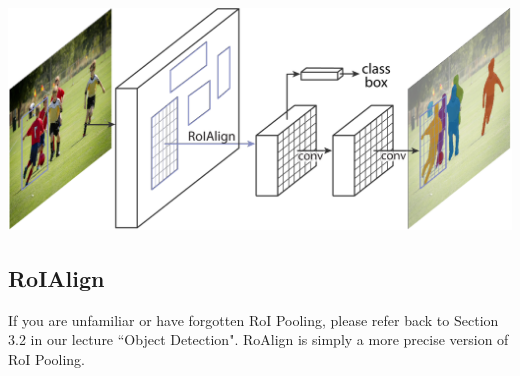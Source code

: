 \documentclass{article}
\begin{document}
\begin{center}
\includegraphics[scale=0.45]{maskrcnn.PNG}
\end{center}

\subsection{RoIAlign}
If you are unfamiliar or have forgotten RoI Pooling, please refer back to Section 3.2 in our lecture ``Object Detection". RoAlign is simply a more precise version of RoI Pooling. 
\end{document}
